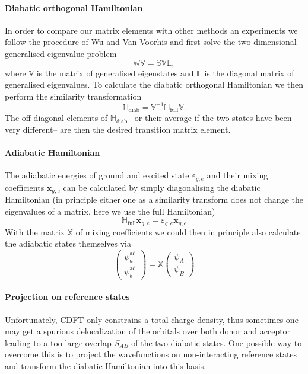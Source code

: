 \documentclass[twoside,10pt,titlepage,a4paper]{article}
\begin{document}
\paragraph{Diabatic orthogonal Hamiltonian}
In order to compare our matrix elements with other methods an experiments we follow the procedure of Wu and Van Voorhis and first solve the two-dimensional generalised eigenvalue problem
\begin{equation}
\mathbb{W} \mathbb{V}=\mathbb{S}\mathbb{V}\mathbb{L},
\end{equation}
where $\mathbb{V}$ is the matrix of generalised eigenstates and $\mathbb{L}$ is the diagonal matrix of generalised eigenvalues.
To calculate the diabatic orthogonal Hamiltonian we then perform the similarity transformation
\begin{equation}
\mathbb{H}_\text{diab}=\mathbb{V}^{-1} \mathbb{H}_\text{full} \mathbb{V}.
\end{equation}
The off-diagonal elements of $\mathbb{H}_\text{diab}$ --or their average if the two states have been very different-- are then the desired transition matrix element.

\paragraph{Adiabatic Hamiltonian}
The adiabatic energies of ground and excited state $\varepsilon_{g,e}$ and their mixing coefficients
$\mathbf{x}_{g,e}$ can be calculated by simply diagonalising the diabatic Hamiltonian (in
principle either one as a similarity transform does not change the eigenvalues of a matrix, here we
use the full Hamiltonian) \begin{equation}
 \mathbb{H}_\text{full}\mathbf{x}_{g,e}=\varepsilon_{g,e}\mathbf{x}_{g,e}
\end{equation}
With the matrix $\mathbb{X}$ of mixing coefficients we could then in principle also calculate the adiabatic states themselves via
\begin{equation}
\label{eq::adiabS}
\left( \begin{array}{c} \psi^\text{ad}_a\\ \psi^\text{ad}_b\end{array}\right)=\mathbb{X} \left( \begin{array}{c} \psi_A\\ \psi_B\end{array}\right)
\end{equation}


\paragraph{Projection on reference states}
Unfortunately, CDFT only constrains a total charge density, thus sometimes one may get a spurious
delocalization of the orbitals over both donor and acceptor leading to a too large overlap $S_{AB}$
of the two diabatic states. One possible way to overcome this is to project the wavefunctions on
non-interacting reference states and transform the diabatic Hamiltonian into this basis.
\end{document}
